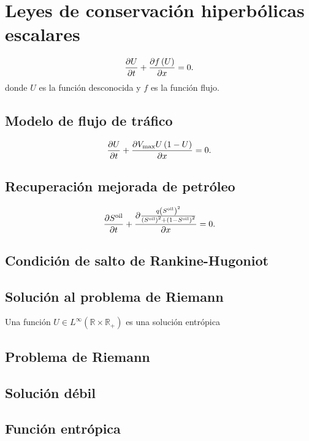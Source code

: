 \chapter{Leyes de conservación hiperbólicas escalares}

\begin{equation}
	\diffp{U}{t}+
	\diffp{f\left(U\right)}{x}=
	0.
\end{equation}
donde $U$ es la función desconocida y $f$ es la función flujo.

\section*{Modelo de flujo de tráfico}

\begin{equation}
	\diffp{U}{t}+
	\diffp{V_{\text{max}}U\left(1-U\right)}{x}=
	0.
\end{equation}

\section*{Recuperación mejorada de petróleo}

\begin{equation}
	\diffp{S^{\text{oil}}}{t}+
	\diffp{
		\frac{q\left(S^{\text{oil}}\right)^{2}}{\left(S^{\text{oil}}\right)^{2}+\left(1-S^{\text{oil}}\right)^{2}}
	}{x}=
	0.
\end{equation}

\section*{Condición de salto de Rankine-Hugoniot}

\section*{Solución al problema de Riemann}

Una función
$U\in L^{\infty}\left(\mathbb{R}\times\mathbb{R}_{+}\right)$
es una solución entrópica


\section{Problema de Riemann}
\section{Solución débil}
\section{Función entrópica}
